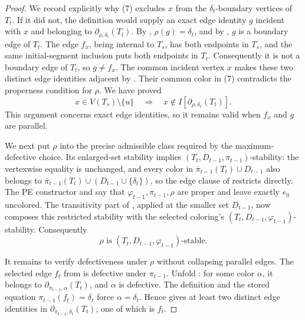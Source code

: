 \begin{proof}
We record explicitly why (7) excludes \(x\) from the
\(\delta_t\)-boundary vertices of \(T_t\).  If it did not, the definition
 would supply an exact edge identity \(g\)
incident with \(x\) and belonging to
\(\partial_{\rho,\delta_t}(T_t)\).  By
, \(\rho(g)=\delta_t\), and by
, \(g\) is a boundary edge of \(T_t\).  The edge
\(f_x\), being internal to \(T_s\), has both endpoints in \(T_s\), and
the same initial-segment inclusion puts both endpoints in \(T_t\).
Consequently it is not a boundary edge of \(T_t\), so \(g\ne f_x\).
The common incident
vertex \(x\) makes these two distinct edge identities adjacent by
.  Their common color in (7) contradicts the
properness condition  for \(\rho\).  We
have proved
\[
 x\in V(T_s)\setminus\{u\}\quad\Longrightarrow\quad
 x\notin I[\partial_{\rho,\delta_t}(T_t)].                       \tag{8}
\]
This argument concerns exact edge identities, so it remains valid when
\(f_x\) and \(g\) are parallel.

We next put \(\rho\) into the precise admissible class required by the
maximum-defective choice.  Its enlarged-set stability implies
\((T_t,D_{t-1},\pi_{t-1})\)-stability: the vertexwise equality is
unchanged, and every color in
\(\overline\pi_{t-1}(T_t)\cup D_{t-1}\) also belongs to
\(\overline\pi_{t-1}(T_t)\cup(D_{t-1}\cup\{\delta_t\})\), so the edge
clause of  restricts directly.  The PE constructor
and  say that
\(\varphi_{t-1},\pi_{t-1},\rho\) are proper and leave exactly \(e_0\)
uncolored.  The transitivity part of , applied at the
smaller set \(D_{t-1}\), now composes this restricted stability with the
selected coloring's
\((T_t,D_{t-1},\varphi_{t-1})\)-stability.  Consequently
\[
                 \rho\text{ is }(T_t,D_{t-1},\varphi_{t-1})
                 \text{-stable}.                              \tag{9}
\]

It remains to verify defectiveness under \(\rho\) without collapsing
parallel edges.  The selected edge \(f_t\) from
 is defective under \(\pi_{t-1}\).
Unfold : for some color \(\alpha\), it belongs to
\(\partial_{\pi_{t-1},\alpha}(T_t)\), and \(\alpha\) is defective.
The definition  and the stored equation
\(\pi_{t-1}(f_t)=\delta_t\) force \(\alpha=\delta_t\).  Hence
 gives at least two distinct edge identities in
\(\partial_{\pi_{t-1},\delta_t}(T_t)\), one of which is \(f_t\).


\end{proof}
